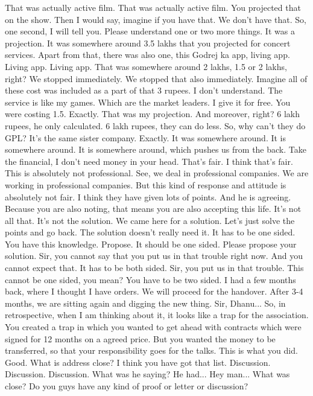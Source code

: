 That was actually active film.
That was actually active film.
You projected that on the show.
Then I would say, imagine if you have that.
We don't have that.
So, one second, I will tell you.
Please understand one or two more things.
It was a projection.
It was somewhere around 3.5 lakhs that you projected for concert services.
Apart from that, there was also one, this Godrej ka app, living app.
Living app.
Living app.
That was somewhere around 2 lakhs, 1.5 or 2 lakhs, right?
We stopped immediately.
We stopped that also immediately.
Imagine all of these cost was included as a part of that 3 rupees.
I don't understand.
The service is like my games.
Which are the market leaders.
I give it for free.
You were costing 1.5.
Exactly.
That was my projection.
And moreover, right?
6 lakh rupees, he only calculated.
6 lakh rupees, they can do less.
So, why can't they do GPL?
It's the same sister company.
Exactly.
It was somewhere around.
It is somewhere around.
It is somewhere around, which pushes us from the back.
Take the financial, I don't need money in your head.
That's fair.
I think that's fair.
This is absolutely not professional.
See, we deal in professional companies.
We are working in professional companies.
But this kind of response and attitude is absolutely not fair.
I think they have given lots of points.
And he is agreeing.
Because you are also noting, that means you are also accepting this life.
It's not all that.
It's not the solution.
We came here for a solution.
Let's just solve the points and go back.
The solution doesn't really need it.
It has to be one sided.
You have this knowledge.
Propose.
It should be one sided.
Please propose your solution.
Sir, you cannot say that you put us in that trouble right now.
And you cannot expect that.
It has to be both sided.
Sir, you put us in that trouble.
This cannot be one sided, you mean?
You have to be two sided.
I had a few months back, where I thought I have orders.
We will proceed for the handover.
After 3-4 months, we are sitting again and digging the new thing.
Sir, Dhanu...
So, in retrospective, when I am thinking about it,
it looks like a trap for the association.
You created a trap in which you wanted to get ahead with contracts
which were signed for 12 months on a agreed price.
But you wanted the money to be transferred,
so that your responsibility goes for the talks.
This is what you did.
Good.
What is address close?
I think you have got that list.
Discussion.
Discussion.
Discussion.
What was he saying?
He had...
Hey man...
What was close?
Do you guys have any kind of proof or letter or discussion?
